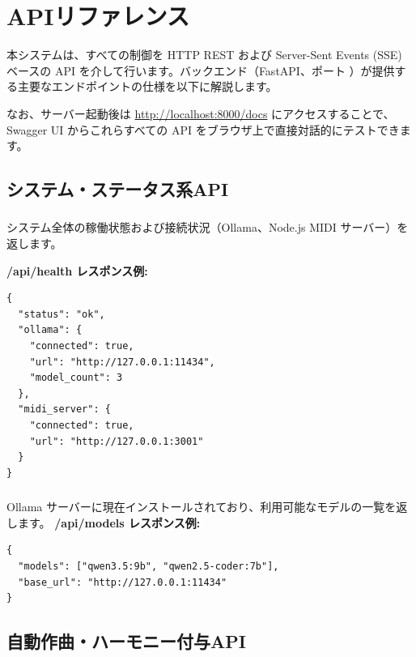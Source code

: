 \section{APIリファレンス}

本システムは、すべての制御を HTTP REST および Server-Sent Events (SSE) ベースの API を介して行います。バックエンド（FastAPI、ポート ）が提供する主要なエンドポイントの仕様を以下に解説します。

なお、サーバー起動後は \url{http://localhost:8000/docs} にアクセスすることで、Swagger UI からこれらすべての API をブラウザ上で直接対話的にテストできます。

\subsection{システム・ステータス系API}

\subsubsection{\texorpdfstring{}{GET /api/health}}
システム全体の稼働状態および接続状況（Ollama、Node.js MIDI サーバー）を返します。

\textbf{/api/health レスポンス例:}\\
\begin{lstlisting}
{
  "status": "ok",
  "ollama": {
    "connected": true,
    "url": "http://127.0.0.1:11434",
    "model_count": 3
  },
  "midi_server": {
    "connected": true,
    "url": "http://127.0.0.1:3001"
  }
}
\end{lstlisting}

\subsubsection{\texorpdfstring{}{GET /api/models}}
Ollama サーバーに現在インストールされており、利用可能なモデルの一覧を返します。
\textbf{/api/models レスポンス例:}\\
\begin{lstlisting}
{
  "models": ["qwen3.5:9b", "qwen2.5-coder:7b"],
  "base_url": "http://127.0.0.1:11434"
}
\end{lstlisting}

\subsection{自動作曲・ハーモニー付与API}

